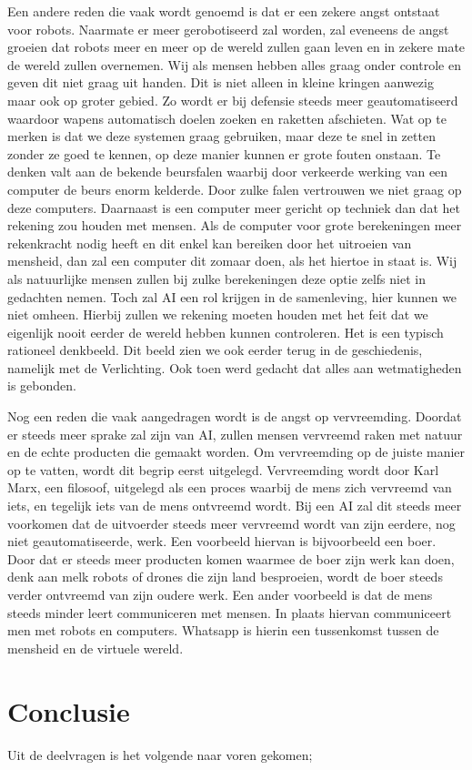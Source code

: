 \documentclass{article}
\begin{document}
Een andere reden die vaak wordt genoemd is dat er een zekere angst ontstaat voor robots. Naarmate er meer gerobotiseerd zal worden, zal eveneens de angst groeien dat robots meer en meer op de wereld zullen gaan leven en in zekere mate de wereld zullen overnemen. Wij als mensen hebben alles graag onder controle en geven dit niet graag uit handen. Dit is niet alleen in kleine kringen aanwezig maar ook op groter gebied. Zo wordt er bij defensie steeds meer geautomatiseerd waardoor wapens automatisch doelen zoeken en raketten afschieten. Wat op te merken is dat we deze systemen graag gebruiken, maar deze te snel in zetten zonder ze goed te kennen, op deze manier kunnen er grote fouten onstaan. Te denken valt aan de bekende beursfalen\cite{vriendofvijand} waarbij door verkeerde werking van een computer de beurs enorm kelderde. Door zulke falen vertrouwen we niet graag op deze computers. Daarnaast is een computer meer gericht op techniek dan dat het rekening zou houden met mensen. Als de computer voor grote berekeningen meer rekenkracht nodig heeft en dit enkel kan bereiken door het uitroeien van mensheid, dan zal een computer dit zomaar doen, als het hiertoe in staat is. Wij als natuurlijke mensen zullen bij zulke berekeningen deze optie zelfs niet in gedachten nemen. Toch zal AI een rol krijgen in de samenleving, hier kunnen we niet omheen. Hierbij zullen we rekening moeten houden met het feit dat we eigenlijk nooit eerder de wereld hebben kunnen controleren. Het is een typisch rationeel denkbeeld. Dit beeld zien we ook eerder terug in de geschiedenis, namelijk met de Verlichting. Ook toen werd gedacht dat alles aan wetmatigheden is gebonden.

Nog een reden die vaak aangedragen wordt is de angst op vervreemding. Doordat er steeds meer sprake zal zijn van AI, zullen mensen vervreemd raken met natuur en de echte producten die gemaakt worden. Om vervreemding op de juiste manier op te vatten, wordt dit begrip eerst uitgelegd. Vervreemding wordt door Karl Marx\cite{vriendofvijand}, een filosoof, uitgelegd als een proces waarbij de mens zich vervreemd van iets, en tegelijk iets van de mens ontvreemd wordt. Bij een AI zal dit steeds meer voorkomen dat de uitvoerder steeds meer vervreemd wordt van zijn eerdere, nog niet geautomatiseerde, werk. Een voorbeeld hiervan is bijvoorbeeld een boer. Door dat er steeds meer producten komen waarmee de boer zijn werk kan doen, denk aan melk robots of drones die zijn land besproeien, wordt de boer steeds verder ontvreemd van zijn oudere werk. Een ander voorbeeld is dat de mens steeds minder leert communiceren met mensen. In plaats hiervan communiceert men met robots en computers. Whatsapp is hierin een tussenkomst tussen de mensheid en de virtuele wereld. 

\section{Conclusie}
Uit de deelvragen is het volgende naar voren gekomen; 

\newpage
\nocite{robotsamenleving,vriendofvijand,arbeidsmarkt,breinoverbodig,stephenhawking,killemachine,uitgeroeid,autonomous,benificialai,pastandfuture,computerziekenhuis}


% 
% 
\end{document}
